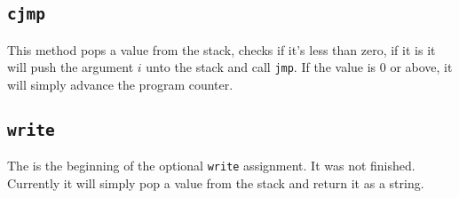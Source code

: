\subsection{\texttt{cjmp}}

This method pops a value from the stack, checks if it's less than zero, if it is
it will push the argument $i$ unto the stack and call \texttt{jmp}. If the value
is 0 or above, it will simply advance the program counter.

\subsection{\texttt{write}}

The is the beginning of the optional \texttt{write} assignment. It was not
finished.  Currently it will simply pop a value from the stack and return it as
a string.
